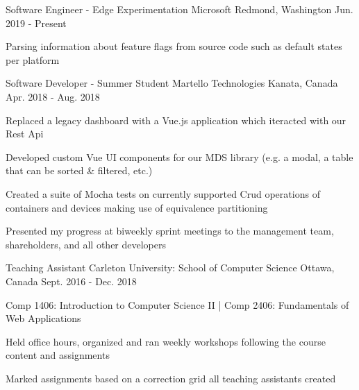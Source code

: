 
\begin{cventries}

  \cventry
    {Software Engineer - Edge Experimentation} %
    {Microsoft} %
    {Redmond, Washington} %
    {Jun. 2019 - Present} %
    {
      \begin{cvitems} %
        \item Parsing information about feature flags from source code such as default states per platform
      \end{cvitems}
    }

  \cventry
    {Software Developer - Summer Student} %
    {Martello Technologies} %
    {Kanata, Canada} %
    {Apr. 2018 - Aug. 2018} %
    {
      \begin{cvitems} %
        \item Replaced a legacy dashboard with a Vue.js application which iteracted with our Rest Api
        \item Developed custom Vue UI components for our MDS library (e.g. a modal, a table that can be sorted \& filtered, etc.)
        \item Created a suite of Mocha tests on currently supported Crud operations of containers and devices making use of equivalence partitioning
        \item Presented my progress at biweekly sprint meetings to the management team, shareholders, and all other developers
      \end{cvitems}
    }

  \cventry
    {Teaching Assistant} %
    {Carleton University: School of Computer Science} %
    {Ottawa, Canada} %
    {Sept. 2016 - Dec. 2018} %
    {
      \begin{cvitems} %
      \item Comp 1406: Introduction to Computer Science II {\color{awesome}|} Comp 2406: Fundamentals of Web Applications
      \item Held office hours, organized and ran weekly workshops following the course content and assignments
      \item Marked assignments based on a correction grid all teaching assistants created
      \end{cvitems}
    }

\end{cventries}
